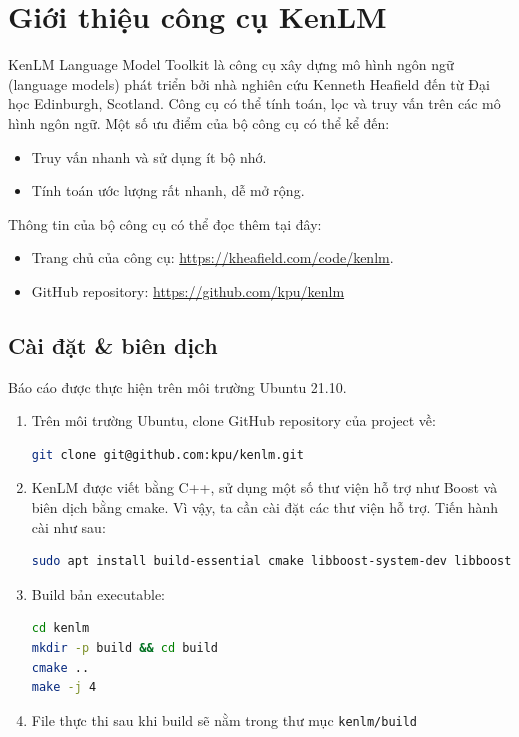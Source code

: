 \documentclass[12pt]{article}
\begin{document}
\tableofcontents
\pagebreak

\section{Giới thiệu công cụ KenLM}
KenLM Language Model Toolkit là công cụ xây dựng mô hình ngôn ngữ (language models) phát triển bởi nhà nghiên cứu Kenneth Heafield đến từ Đại học Edinburgh, Scotland. Công cụ có thể tính toán, lọc và truy vấn trên các mô hình ngôn ngữ. Một số ưu điểm của bộ công cụ có thể kể đến:
\begin{itemize}
\item Truy vấn nhanh và sử dụng ít bộ nhớ.\cite{heafield-2011-kenlm}
\item Tính toán ước lượng rất nhanh, dễ mở rộng.\cite{heafield-etal-2013-scalable}
\end{itemize}
Thông tin của bộ công cụ có thể đọc thêm tại đây:
\begin{itemize}
\item Trang chủ của công cụ: \href{https://kheafield.com/code/kenlm}{https://kheafield.com/code/kenlm}.
\item GitHub repository: \href{https://github.com/kpu/kenlm}{https://github.com/kpu/kenlm}
\end{itemize}
\subsection{Cài đặt \& biên dịch}
Báo cáo được thực hiện trên môi trường Ubuntu 21.10.
\begin{enumerate}
\item Trên môi trường Ubuntu, clone GitHub repository của project về:
\begin{lstlisting}[language=sh]
git clone git@github.com:kpu/kenlm.git
\end{lstlisting}

\item KenLM được viết bằng C++, sử dụng một số thư viện hỗ trợ như Boost và biên dịch bằng cmake. Vì vậy, ta cần cài đặt các thư viện hỗ trợ. Tiến hành cài như sau:
\begin{lstlisting}[language=sh]
sudo apt install build-essential cmake libboost-system-dev libboost-thread-dev libboost-program-options-dev libboost-test-dev libeigen3-dev zlib1g-dev libbz2-dev liblzma-dev
\end{lstlisting}

\item Build bản executable:
\begin{lstlisting}[language=sh]
cd kenlm
mkdir -p build && cd build
cmake ..
make -j 4
\end{lstlisting}
\item File thực thi sau khi build sẽ nằm trong thư mục \texttt{kenlm/build}
\end{enumerate}
\end{document}
